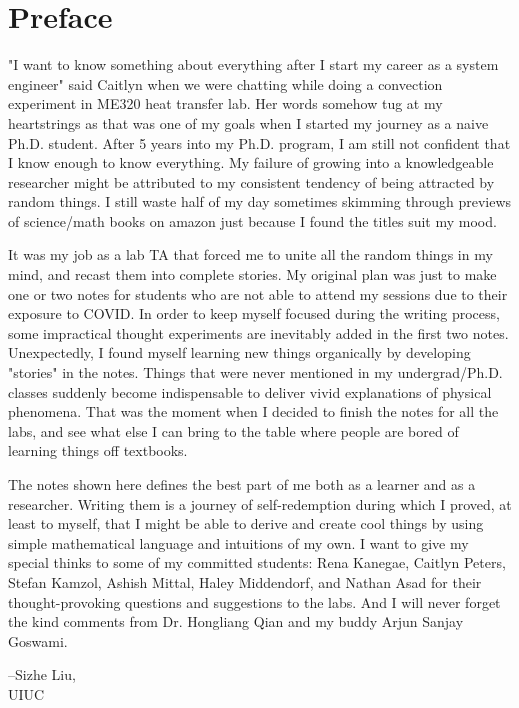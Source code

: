\chapter{Preface}
\begin{fullwidth}
	"I want to know something about everything after I start my career as a system engineer" said Caitlyn when we were chatting while doing a convection experiment in ME320 heat transfer lab. Her words somehow tug at my heartstrings as that was one of my goals when I started my journey as a naive Ph.D. student. After 5 years into my Ph.D. program, I am still not confident that I know enough to know everything. My failure of growing into a knowledgeable researcher might be attributed to my consistent tendency of being attracted by random things. I still waste half of my day sometimes skimming through previews of science/math books on amazon just because I found the titles suit my mood. 
	
	It was my job as a lab TA that forced me to unite all the random things in my mind, and recast them into complete stories. My original plan was just to make one or two notes for students who are not able to attend my sessions due to their exposure to COVID. In order to keep myself focused during the writing process, some impractical thought experiments are inevitably added in the first two notes. Unexpectedly, I found myself learning new things organically by developing "stories" in the notes. Things that were never mentioned in my undergrad/Ph.D. classes suddenly become indispensable to deliver vivid explanations of physical phenomena. That was the moment when I decided to finish the notes for all the labs, and see what else I can bring to the table where people are bored of learning things off textbooks. 
	
	The notes shown here defines the best part of me both as a learner and as a researcher. Writing them is a journey of self-redemption during which I proved, at least to myself, that I might be able to derive and create cool things by using simple mathematical language and intuitions of my own. I want to give my special thinks to some of my committed students: Rena Kanegae, Caitlyn Peters, Stefan Kamzol, Ashish Mittal, Haley Middendorf, and Nathan Asad for their thought-provoking questions and suggestions to the labs. And I will never forget the kind comments from Dr. Hongliang Qian and my buddy Arjun Sanjay Goswami.
	\begin{flushright}
		--Sizhe Liu, \\UIUC
	\end{flushright}
\end{fullwidth}
